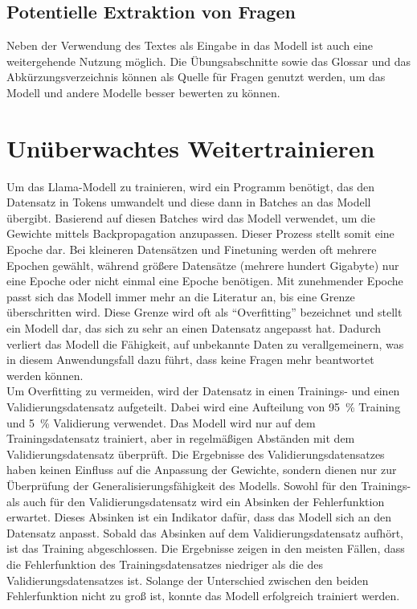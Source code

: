 \subsection{Potentielle Extraktion von Fragen}
Neben der Verwendung des Textes als Eingabe in das Modell ist auch eine weitergehende Nutzung möglich.
Die Übungsabschnitte sowie das Glossar und das Abkürzungsverzeichnis können als Quelle für Fragen genutzt werden,
um das Modell und andere Modelle besser bewerten zu können.

\section{Unüberwachtes Weitertrainieren}
Um das Llama-Modell zu trainieren, wird ein Programm benötigt, das den Datensatz in Tokens umwandelt und diese dann in Batches an das Modell übergibt.
Basierend auf diesen Batches wird das Modell verwendet, um die Gewichte mittels Backpropagation anzupassen.
Dieser Prozess stellt somit eine Epoche dar.
Bei kleineren Datensätzen und Finetuning werden oft mehrere Epochen gewählt, während größere Datensätze (mehrere hundert Gigabyte) nur eine Epoche oder nicht einmal eine Epoche benötigen.
Mit zunehmender Epoche passt sich das Modell immer mehr an die Literatur an, bis eine Grenze überschritten wird.
Diese Grenze wird oft als \enquote{Overfitting} bezeichnet und stellt ein Modell dar, das sich zu sehr an einen Datensatz angepasst hat.
Dadurch verliert das Modell die Fähigkeit, auf unbekannte Daten zu verallgemeinern, was in diesem Anwendungsfall dazu führt, dass keine Fragen mehr beantwortet werden können.\\

Um Overfitting zu vermeiden, wird der Datensatz in einen Trainings- und einen Validierungsdatensatz aufgeteilt.
Dabei wird eine Aufteilung von \SI{95}{\percent} Training und \SI{5}{\percent} Validierung verwendet.
Das Modell wird nur auf dem Trainingsdatensatz trainiert, aber in regelmäßigen Abständen mit dem Validierungsdatensatz überprüft.
Die Ergebnisse des Validierungsdatensatzes haben keinen Einfluss auf die Anpassung der Gewichte, sondern dienen nur zur Überprüfung der Generalisierungsfähigkeit des Modells.
Sowohl für den Trainings- als auch für den Validierungsdatensatz wird ein Absinken der Fehlerfunktion erwartet.
Dieses Absinken ist ein Indikator dafür, dass das Modell sich an den Datensatz anpasst.
Sobald das Absinken auf dem Validierungsdatensatz aufhört, ist das Training abgeschlossen.
Die Ergebnisse zeigen in den meisten Fällen, dass die Fehlerfunktion des Trainingsdatensatzes niedriger als die des Validierungsdatensatzes ist.
Solange der Unterschied zwischen den beiden Fehlerfunktion nicht zu groß ist, konnte das Modell erfolgreich trainiert werden.\\


